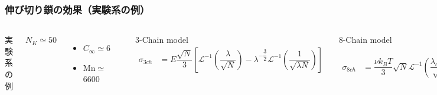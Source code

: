 \documentclass[11pt, dvipdfmx]{beamer}
\begin{document}
\begin{frame}
\frametitle{伸び切り鎖の効果（実験系の例）}

\begin{columns}[totalwidth=1\textwidth]

{\Large 実験系の例}

\small
$N_K\simeq50$
	\begin{itemize}
	\item
	$C_{\infty} \simeq 6$
	\item
	Mn$\simeq$6600
	\end{itemize}

\includegraphics[width=50mm]{./fig/SS_6_Stretch.pdf}

\footnotesize
3-Chain model
\tiny
\begin{align*}
\sigma_{3ch}
	&= E\dfrac{\sqrt{N} }{3 } 
		\left[ 
			\mathcal{L}^{-1} \left(\dfrac{\lambda}{ \sqrt{N} } \right) 
			- \lambda^{-\dfrac{3}{2}} \mathcal{L}^{-1} \left( \dfrac{1}{ \sqrt{\lambda N} } \right)
		\right]
\end{align*}

\footnotesize
8-Chain model
\tiny
\begin{align*}
\sigma_{8ch}
	&= \dfrac{\nu k_B T }{3}\sqrt{N}
			\mathcal{L}^{-1} \left(\dfrac{\lambda_{chain}}{ \sqrt{N} } \right)
			\dfrac{\lambda-\dfrac{1}{\lambda^2}}{\lambda_{chain}} 
\end{align*}

\footnotesize
Full-Chain Model
\tiny
\begin{align*}
&\sigma_{Full} = E \dfrac{\sqrt{N}}{4\pi} \\
&\times \int_0^{\pi} \int_0^{2\pi} \mathcal{L}^{-1} \left( \dfrac{\lambda}{\sqrt{N}} \right) \dfrac{\lambda_i^2 m_i^2}{\lambda} \sin \theta \mathrm{d} \theta \mathrm{d} \phi \\
&m_0 = \sin \theta \cos \theta,\; m_1 = \sin \theta \sin \phi,\\
&m_2 = \cos \theta,\;\lambda^2 = \sum_{i=0}^2 \lambda_i^2m_i^2
\end{align*}
\normalsize
\end{columns}
\end{frame}
\end{document}
